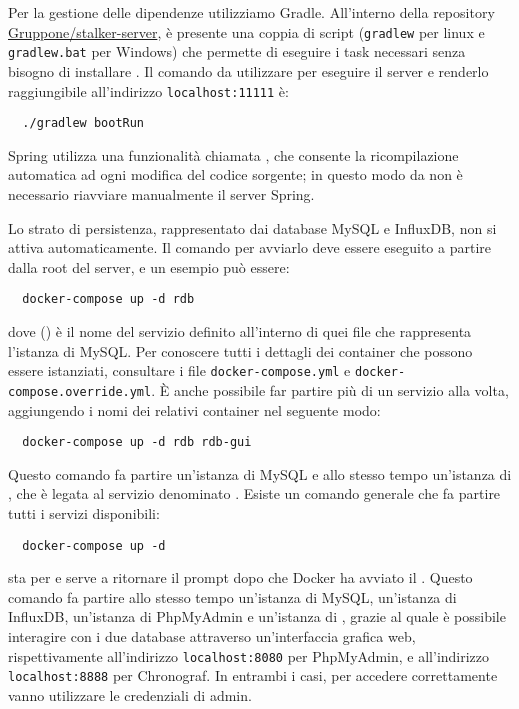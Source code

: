 \documentclass[../../manuale-manutentore.tex]{subfiles}
\begin{document}
Per la gestione delle dipendenze utilizziamo Gradle.
All'interno della repository \href{Gruppone/stalker-server}{Gruppone/stalker-server}, è presente una coppia di script (\texttt{gradlew} per linux e \texttt{gradlew.bat} per Windows) che permette di eseguire i task necessari senza bisogno di installare .
Il comando da utilizzare per eseguire il server e renderlo raggiungibile all'indirizzo \texttt{localhost:11111} è:

\begin{verbatim}
  ./gradlew bootRun
\end{verbatim}

Spring utilizza una funzionalità chiamata , che consente la ricompilazione automatica ad ogni modifica del codice sorgente; in questo modo da non è necessario riavviare manualmente il server Spring.\par
Lo strato di persistenza, rappresentato dai database MySQL e InfluxDB, non si attiva automaticamente.
Il comando per avviarlo deve essere eseguito a partire dalla root del server, e un esempio può essere:

\begin{verbatim}
  docker-compose up -d rdb
\end{verbatim}

dove  () è il nome del servizio definito all'interno di quei file che rappresenta l'istanza di MySQL\@.
Per conoscere tutti i dettagli dei container che possono essere istanziati, consultare i file \texttt{docker-compose.yml} e \texttt{docker-compose.override.yml}.
È anche possibile far partire più di un servizio alla volta, aggiungendo i nomi dei relativi container nel seguente modo:

\begin{verbatim}
  docker-compose up -d rdb rdb-gui
\end{verbatim}

Questo comando fa partire un'istanza di MySQL e allo stesso tempo un'istanza di , che è legata al servizio denominato .
Esiste un comando generale che fa partire tutti i servizi disponibili:

\begin{verbatim}
  docker-compose up -d
\end{verbatim}

 sta per  e serve a ritornare il prompt dopo che Docker ha avviato il .
Questo comando fa partire allo stesso tempo un'istanza di MySQL, un'istanza di InfluxDB, un'istanza di PhpMyAdmin e un'istanza di , grazie al quale è possibile interagire con i due database attraverso un'interfaccia grafica web, rispettivamente all'indirizzo \texttt{localhost:8080} per PhpMyAdmin, e all'indirizzo \texttt{localhost:8888} per Chronograf. In entrambi i casi, per accedere correttamente vanno utilizzare le credenziali di admin.
\end{document}
